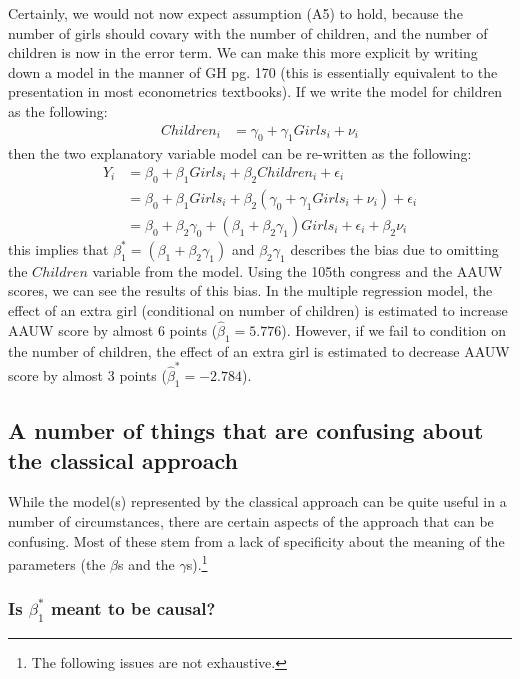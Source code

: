\documentclass{article}
\begin{document}
Certainly, we would not now expect assumption (A5) to hold, because the number of girls should covary with the number of children, and the number of children is now in the error term. We can make this more explicit by writing down a model in the manner of GH pg. 170 (this is essentially equivalent to the presentation in most econometrics textbooks).  If we write the model for children as the following: 
\begin{align}\label{eq:children}
Children_i &= \gamma_0 + \gamma_1 Girls_i + \nu_i
\end{align}
then the two explanatory variable model can be re-written as the following:
\begin{align*}
Y_i &= \beta_0 + \beta_1 Girls_i + \beta_2 Children_i + \epsilon_i \\
&= \beta_0 + \beta_1 Girls_i + \beta_2 (\gamma_0 + \gamma_1 Girls_i + \nu_i) + \epsilon_i \\
&= \beta_0 + \beta_2 \gamma_0 + (\beta_1 + \beta_2 \gamma_1) Girls_i + \epsilon_i + \beta_2 \nu_i
\end{align*}
this implies that $\beta_1^{*} = (\beta_1 + \beta_2 \gamma_1)$ and $\beta_2 \gamma_1$ describes the bias due to omitting the $Children$ variable from the model. Using the 105th congress and the AAUW scores, we can see the results of this bias. In the multiple regression model, the effect of an extra girl (conditional on number of children) is estimated to increase AAUW score by almost 6 points ($\widehat{\beta}_1= 5.776$). However, if we fail to condition on the number of children, the effect of an extra girl is estimated to decrease AAUW score by almost 3 points ($\widehat{\beta}_1^{*}= -2.784$).

\subsection{A number of things that are confusing about the classical approach}

While the model(s) represented by the classical approach can be quite useful in a number of circumstances, there are certain aspects of the approach that can be confusing. Most of these stem from a lack of specificity about the meaning of the parameters (the $\beta$s and the $\gamma$s).\footnote{The following issues are not exhaustive.} 

\subsubsection{Is $\beta_1^{*}$ meant to be causal?}
\end{document}
